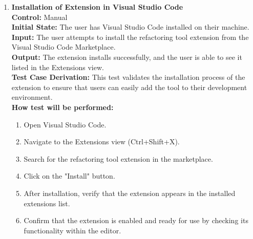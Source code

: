 \documentclass[12pt, titlepage]{article}
\begin{document}
\begin{enumerate}[label={\bf
    \textcolor{Maroon}{test-FR-IE-\arabic*}}, wide=0pt, font=\itshape]
  \item \textbf{Installation of Extension in Visual Studio Code}\\[2mm]
    \textbf{Control:} Manual\\
    \textbf{Initial State:} The user has Visual Studio Code installed
    on their machine.\\
    \textbf{Input:} The user attempts to install the refactoring tool
    extension from the Visual Studio Code Marketplace.\\
    \textbf{Output:} The extension installs successfully, and the
    user is able to see it listed in the Extensions view.\\[2mm]
    \textbf{Test Case Derivation:} This test validates the
    installation process of the extension to ensure that users can
    easily add the tool to their development environment.\\[2mm]
    \textbf{How test will be performed:}
    \begin{enumerate}[label=\arabic*.]
      \item Open Visual Studio Code.
      \item Navigate to the Extensions view (Ctrl+Shift+X).
      \item Search for the refactoring tool extension in the marketplace.
      \item Click on the "Install" button.
      \item After installation, verify that the extension appears in
        the installed extensions list.
      \item Confirm that the extension is enabled and ready for use
        by checking its functionality within the editor.
    \end{enumerate}


\end{enumerate}
\end{document}

